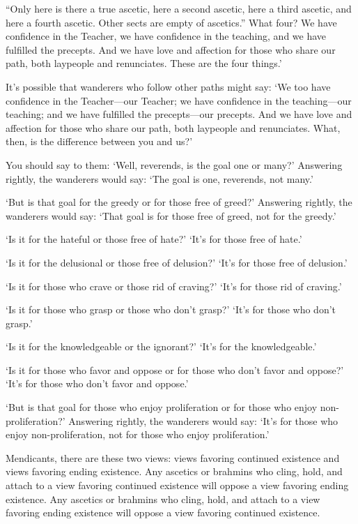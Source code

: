 \documentclass[12pt,openany]{book}%
\begin{document}
“Only here is there a true ascetic, here a second ascetic, here a third ascetic, and here a fourth ascetic. Other sects are empty of ascetics.” What four? We have confidence in the Teacher, we have confidence in the teaching, and we have fulfilled the precepts. And we have love and affection for those who share our path, both laypeople and renunciates. These are the four things.’ 

It’s possible that wanderers who follow other paths might say: ‘We too have confidence in the Teacher—our Teacher; we have confidence in the teaching—our teaching; and we have fulfilled the precepts—our precepts. And we have love and affection for those who share our path, both laypeople and renunciates. What, then, is the difference between you and us?’ 

You should say to them: ‘Well, reverends, is the goal one or many?’ Answering rightly, the wanderers would say: ‘The goal is one, reverends, not many.’ 

‘But is that goal for the greedy or for those free of greed?’ Answering rightly, the wanderers would say: ‘That goal is for those free of greed, not for the greedy.’ 

‘Is it for the hateful or those free of hate?’ ‘It’s for those free of hate.’ 

‘Is it for the delusional or those free of delusion?’ ‘It’s for those free of delusion.’ 

‘Is it for those who crave or those rid of craving?’ ‘It’s for those rid of craving.’ 

‘Is it for those who grasp or those who don’t grasp?’ ‘It’s for those who don’t grasp.’ 

‘Is it for the knowledgeable or the ignorant?’ ‘It’s for the knowledgeable.’ 

‘Is it for those who favor and oppose or for those who don’t favor and oppose?’ ‘It’s for those who don’t favor and oppose.’ 

‘But is that goal for those who enjoy proliferation or for those who enjoy non-proliferation?’ Answering rightly, the wanderers would say: ‘It’s for those who enjoy non-proliferation, not for those who enjoy proliferation.’ 

Mendicants, there are these two views: views favoring continued existence and views favoring ending existence. Any ascetics or brahmins who cling, hold, and attach to a view favoring continued existence will oppose a view favoring ending existence. Any ascetics or brahmins who cling, hold, and attach to a view favoring ending existence will oppose a view favoring continued existence. 
\end{document}
